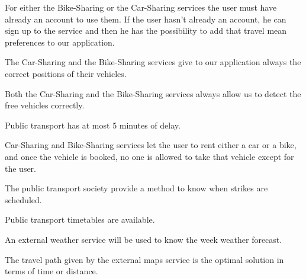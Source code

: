 \begin{domainList}
\item For either the Bike-Sharing or the Car-Sharing services the user must have already an account to use them. If the user hasn't already an account, he can sign up to the service and then he has the possibility to add that travel mean preferences to our application.

\item The Car-Sharing and the Bike-Sharing services give to our application always the correct positions of their vehicles.

\item Both the Car-Sharing and the Bike-Sharing services always allow us to detect the free vehicles correctly.

\item Public transport has at most 5 minutes of delay.

\item Car-Sharing and Bike-Sharing services let the user to rent either a car or a bike, and once the vehicle is booked, no one is allowed to take that vehicle except for the user.

\item The public transport society provide a method to know when strikes are scheduled.

\item Public transport timetables are available.

\item An external weather service will be used to know the week weather forecast.

\item The travel path given by the external maps service is the optimal solution in terms of time or distance.

\end{domainList}

